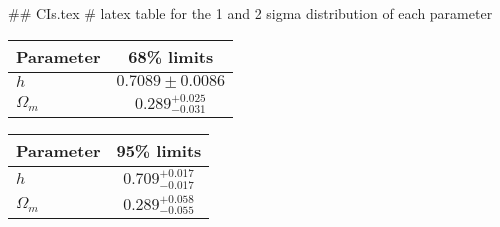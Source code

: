 ## CIs.tex
# latex table for the 1 and 2 sigma distribution of each parameter

\begin{tabular} { l  c}
 Parameter &  68\% limits\\
\hline
{\boldmath$h              $} & $0.7089\pm 0.0086          $\\
{\boldmath$\Omega_m       $} & $0.289^{+0.025}_{-0.031}   $\\
\hline
\end{tabular}

\begin{tabular} { l  c}
 Parameter &  95\% limits\\
\hline
{\boldmath$h              $} & $0.709^{+0.017}_{-0.017}   $\\
{\boldmath$\Omega_m       $} & $0.289^{+0.058}_{-0.055}   $\\
\hline
\end{tabular}
